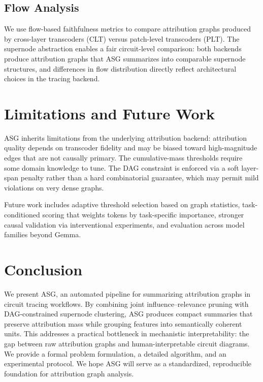 \documentclass[11pt]{article}
\begin{document}
\subsection{Flow Analysis}

We use flow-based faithfulness metrics \cite{circuit-tracer} to compare attribution graphs produced by cross-layer transcoders (CLT) versus patch-level transcoders (PLT). The supernode abstraction enables a fair circuit-level comparison: both backends produce attribution graphs that ASG summarizes into comparable supernode structures, and differences in flow distribution directly reflect architectural choices in the tracing backend.

\section{Limitations and Future Work}

ASG inherits limitations from the underlying attribution backend: attribution quality depends on transcoder fidelity and may be biased toward high-magnitude edges that are not causally primary. The cumulative-mass thresholds require some domain knowledge to tune. The DAG constraint is enforced via a soft layer-span penalty rather than a hard combinatorial guarantee, which may permit mild violations on very dense graphs.

Future work includes adaptive threshold selection based on graph statistics, task-conditioned scoring that weights tokens by task-specific importance, stronger causal validation via interventional experiments, and evaluation across model families beyond Gemma.

\section{Conclusion}

We present ASG, an automated pipeline for summarizing attribution graphs in circuit tracing workflows. By combining joint influence--relevance pruning with DAG-constrained supernode clustering, ASG produces compact summaries that preserve attribution mass while grouping features into semantically coherent units. This addresses a practical bottleneck in mechanistic interpretability: the gap between raw attribution graphs and human-interpretable circuit diagrams. We provide a formal problem formulation, a detailed algorithm, and an experimental protocol. We hope ASG will serve as a standardized, reproducible foundation for attribution graph analysis.
\end{document}
